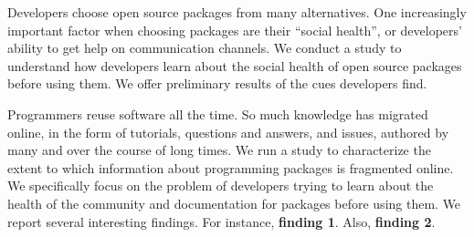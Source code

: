 Developers choose open source packages from many alternatives.
One increasingly important factor when choosing packages are their ``social health'', or developers' ability to get help on communication channels.
We conduct a study to understand how developers learn about the social health of open source packages before using them.
We offer preliminary results of the cues developers find.

Programmers reuse software all the time.
So much knowledge has migrated online, in the form of tutorials, questions and answers, and issues, authored by many and over the course of long times.
We run a study to characterize the extent to which information about programming packages is fragmented online.
We specifically focus on the problem of developers trying to learn about the health of the community and documentation for packages before using them.
We report several interesting findings.
For instance, \textbf{finding 1}.
Also, \textbf{finding 2}.
\fi
